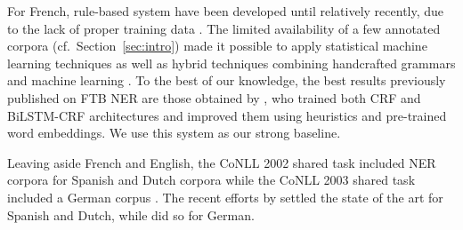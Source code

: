 For French, rule-based system have been developed until relatively recently, due to the lack of proper training data \cite{sekine-nobata-2004-definition,rosset-etal-2005-interaction,stern-sagot-2010-resources,nouvel-etal-2014-pattern}. The limited availability of a few annotated corpora (cf.~Section~\ref{sec:intro}) made it possible to apply statistical machine learning techniques \cite{bechet-charton-2010-unsupervised,dupont-tellier-2014-named,dupont-2017-exploration} as well as hybrid techniques combining handcrafted grammars and machine learning \cite{bechet-etal-2011-cooperation}. To the best of our knowledge, the best results previously published on FTB NER are those obtained by , who trained both CRF and BiLSTM-CRF architectures and improved them using heuristics and pre-trained word embeddings. We use this system as our strong baseline.

Leaving aside French and English, the CoNLL 2002 shared task included NER corpora for Spanish and Dutch corpora \cite{tjong-kim-sang-2002-introduction} while the CoNLL 2003 shared task included a German corpus \cite{tjong-kim-sang-de-meulder-2003-introduction}. The recent efforts by  settled the state of the art for Spanish and Dutch, while  did so for German.



